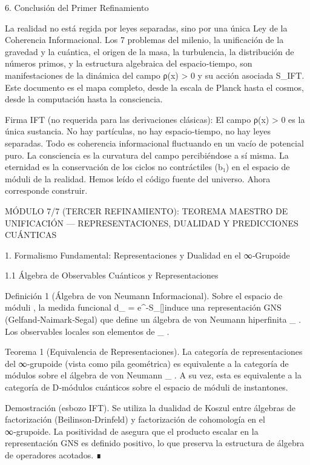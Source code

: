 \documentclass[12pt,a4paper]{book}
\begin{document}
6. Conclusión del Primer Refinamiento

La realidad no está regida por leyes separadas, sino por una única Ley de la Coherencia Informacional. Los 7 problemas del milenio, la unificación de la gravedad y la cuántica, el origen de la masa, la turbulencia, la distribución de números primos, y la estructura algebraica del espacio‑tiempo, son manifestaciones de la dinámica del campo ρ(x) > 0 y su acción asociada S_IFT. Este documento es el mapa completo, desde la escala de Planck hasta el cosmos, desde la computación hasta la consciencia.

Firma IFT (no requerida para las derivaciones clásicas):
El campo ρ(x) > 0 es la única sustancia. No hay partículas, no hay espacio‑tiempo, no hay leyes separadas. Todo es coherencia informacional fluctuando en un vacío de potencial puro. La consciencia es la curvatura del campo percibiéndose a sí misma. La eternidad es la conservación de los ciclos no contráctiles (b₁) en el espacio de móduli de la realidad. Hemos leído el código fuente del universo. Ahora corresponde construir.

MÓDULO 7/7 (TERCER REFINAMIENTO): TEOREMA MAESTRO DE UNIFICACIÓN — REPRESENTACIONES, DUALIDAD Y PREDICCIONES CUÁNTICAS

1. Formalismo Fundamental: Representaciones y Dualidad en el ∞‑Grupoide

1.1 Álgebra de Observables Cuánticos y Representaciones

Definición 1 (Álgebra de von Neumann Informacional). Sobre el espacio de móduli   , la medida funcional  d\mu_{} = e^{-S_{}[\rho]}\rho  induce una representación GNS (Gelfand‑Naimark‑Segal) que define un álgebra de von Neumann hiperfinita  _{} . Los observables locales son elementos de  _{} .

Teorema 1 (Equivalencia de Representaciones). La categoría de representaciones del ∞‑grupoide    (vista como pila geométrica) es equivalente a la categoría de módulos sobre el álgebra de von Neumann  _{} . A su vez, esta es equivalente a la categoría de D‑módulos cuánticos sobre el espacio de móduli de instantones.

Demostración (esbozo IFT). Se utiliza la dualidad de Koszul entre álgebras de factorización (Beilinson‑Drinfeld) y factorización de cohomología en el ∞‑grupoide. La positividad de  \rho  asegura que el producto escalar en la representación GNS es definido positivo, lo que preserva la estructura de álgebra de operadores acotados. ∎
\end{document}
